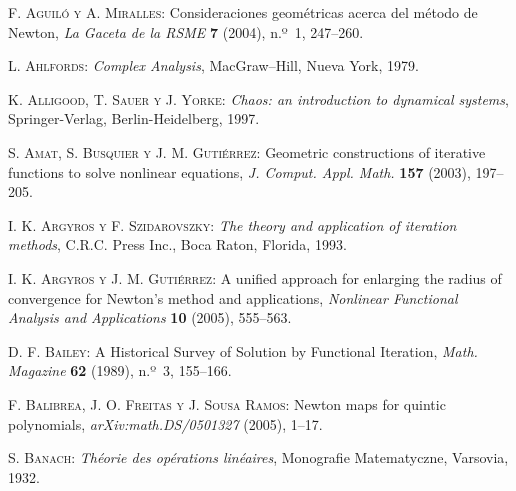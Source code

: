 %






\begin{thebibliography}{999}

\frenchspacing

\textsc{F. Aguiló y A. Miralles}:
{Consideraciones geométricas acerca del método de Newton},
\textit{La Gaceta de la RSME} \textbf{7} (2004), n.º~1, 247--260.


\textsc{L. Ahlfords}:
\textit{Complex Analysis},
MacGraw--Hill, Nueva York, 1979.


\textsc{K. Alligood, T. Sauer y J. Yorke}:
\textit{Chaos: an introduction to dynamical systems},
Springer-Verlag,  Berlin-Heidelberg, 1997.

\textsc{S. Amat, S. Busquier y J. M. Gutiérrez}:
{Geometric constructions of iterative functions to solve nonlinear equations},
\textit{J. Comput. Appl. Math.} \textbf{157} (2003), 197--205.


\textsc{I. K. Argyros y F. Szidarovszky}:
\textit{The theory and application of iteration methods},
C.R.C. Press Inc., Boca Raton, Florida, 1993.

\textsc{I. K. Argyros y J. M. Gutiérrez}:
 {A unified approach for enlarging the radius of convergence for Newton's method and applications},
\textit{Nonlinear Functional Analysis and Applications} \textbf{10} (2005), 555--563.

\textsc{D. F. Bailey}:
{A Historical Survey of Solution by Functional Iteration},
\textit{Math. Magazine} \textbf{62} (1989), n.º~3, 155--166.

\textsc{F. Balibrea, J. O. Freitas y J. Sousa Ramos}:
{Newton maps for quintic polynomials},
\textit{arXiv:math.DS/0501327} (2005),  1--17.


\textsc{S. Banach}:
\textit{Théorie des opérations linéaires},
Monografie Matematyczne, Varsovia, 1932.


\end{thebibliography}
